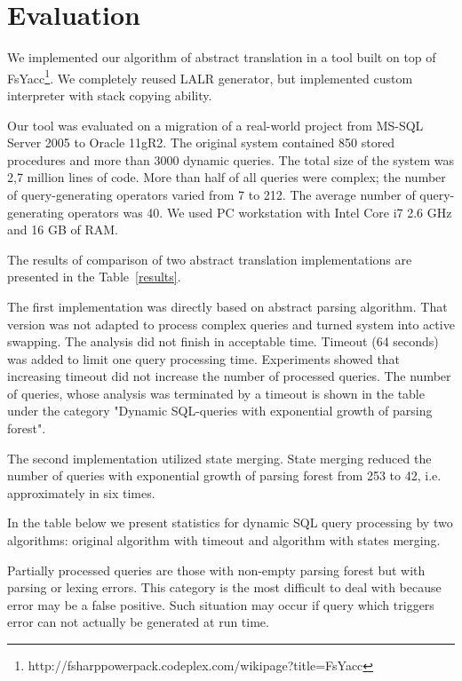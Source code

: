 \section{Evaluation}
\label{sec:Evaluation}

We implemented our algorithm of abstract translation in a tool built on top of 
FsYacc\footnote{http://fsharppowerpack.codeplex.com/wikipage?title=FsYacc}. We completely 
reused LALR generator, but implemented custom interpreter with stack copying ability. 

Our tool was evaluated on a migration of a real-world project from MS-SQL Server 2005 to Oracle 11gR2. 
The original system contained 850 stored procedures and more than 3000 dynamic queries. 
The total size of the system was 2,7 million lines of code. More than half of all queries were 
complex; the number of query-generating operators varied from 7 to 212. The average number of 
query-generating operators was 40. We used PC workstation with Intel Core i7 2.6 GHz and 16 GB of RAM.

The results of comparison of two abstract translation implementations are presented in the Table~\ref{results}.

The first implementation was directly based on abstract parsing algorithm. That version was not adapted 
to process complex queries and turned system into active swapping. The analysis did not finish
in acceptable time. Timeout (64 seconds) was added to limit one query processing time. Experiments 
showed that increasing timeout did not increase the number of processed queries. The number of queries,
whose analysis was terminated by a timeout is shown in the table under the category 
"Dynamic SQL-queries with exponential growth of parsing forest".

The second implementation utilized state merging. State merging reduced the number of queries with 
exponential growth of parsing forest from 253 to 42, i.e. approximately in six times.

In the table below we present statistics for dynamic SQL query processing by two algorithms: original algorithm with timeout and algorithm with states merging.

Partially processed queries are those with non-empty parsing forest but with parsing or lexing errors. 
This category is the most difficult to deal with because error may be a false positive. Such situation may 
occur if query which triggers error can not actually be generated at run time.

